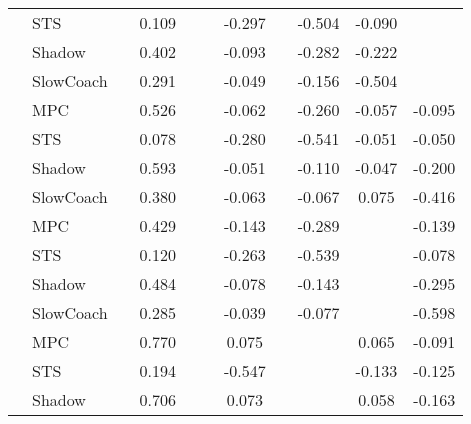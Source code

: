 \begin{tabular}{|l|l|*{9}{c|}}
                                                           & STS &       &     0.109 &        &     & -0.297 &     &  -0.504 &  -0.090 &       \\
                                                           & Shadow &       &     0.402 &        &     & -0.093 &     &  -0.282 &  -0.222 &       \\
                                                           & SlowCoach &       &     0.291 &        &     & -0.049 &     &  -0.156 &  -0.504 &       \\
\midrule
[False, True, False, False, True, False, True, True, True] & MPC &       &     0.526 &        &     & -0.062 &     &  -0.260 &  -0.057 &   -0.095 \\
                                                           & STS &       &     0.078 &        &     & -0.280 &     &  -0.541 &  -0.051 &   -0.050 \\
                                                           & Shadow &       &     0.593 &        &     & -0.051 &     &  -0.110 &  -0.047 &   -0.200 \\
                                                           & SlowCoach &       &     0.380 &        &     & -0.063 &     &  -0.067 &   0.075 &   -0.416 \\
\midrule
[False, True, False, False, True, False, True, False, True] & MPC &       &     0.429 &        &     & -0.143 &     &  -0.289 &      &   -0.139 \\
                                                           & STS &       &     0.120 &        &     & -0.263 &     &  -0.539 &      &   -0.078 \\
                                                           & Shadow &       &     0.484 &        &     & -0.078 &     &  -0.143 &      &   -0.295 \\
                                                           & SlowCoach &       &     0.285 &        &     & -0.039 &     &  -0.077 &      &   -0.598 \\
\midrule
[False, True, False, False, True, False, False, True, True] & MPC &       &     0.770 &        &     &  0.075 &     &      &   0.065 &   -0.091 \\
                                                           & STS &       &     0.194 &        &     & -0.547 &     &      &  -0.133 &   -0.125 \\
                                                           & Shadow &       &     0.706 &        &     &  0.073 &     &      &   0.058 &   -0.163 \\

\end{tabular}

